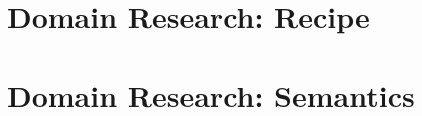 \appendix

% 
\chapter{Domain Research: Recipe} \label{app:recipe}

\chapter{Domain Research: Semantics} \label{app:semantics}
